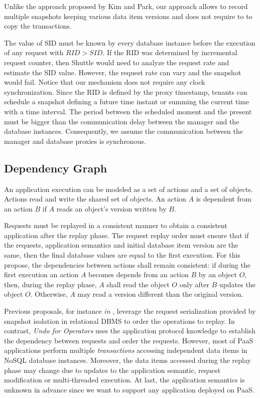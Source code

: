 Unlike the approach proposed by Kim and Park, our approach allows to record multiple snapshots keeping various data item versions and does not require to to copy the transactions.

The value of \acf{SID} must be known by every database instance before the execution of any request with $RID > SID$. If the \ac{RID} was determined by incremental request counter, then Shuttle would need to analyze the request rate and estimate the \ac{SID} value. However, the request rate can vary and the snapshot would fail. Notice that our mechanism does not require any clock synchronization. Since the \ac{RID} is defined by the proxy timestamp, tenants can schedule a snapshot defining a future time instant or summing the current time with a time interval. The period between the scheduled moment and the present must be bigger than the communication delay between the manager and the database instances. Consequently, we assume the communication between the manager and database proxies is synchronous. 


\subsection{Dependency Graph}
\label{sec:arch:dependencies}
An application execution can be modeled as a set of actions and a set of objects. Actions read and write the shared set of objects. An action $A$ is dependent from an action $B$ if $A$ reads an object's version written by $B$.

Requests must be replayed in a consistent manner to obtain a consistent application after the replay phase. The request replay order must ensure that if the requests, application semantics and initial database item version are the same, then the final database values are equal to the first execution. For this propose, the dependencies between actions shall remain consistent: if during the first execution an action $A$ becomes depends from an action $B$ by an object $O$, then, during the replay phase, $A$ shall read the object $O$ only after $B$ updates the object $O$. Otherwise, $A$ may read a version different than the original version.

Previous proposals, for instance \emph{in} \cite{goel}, leverage the request serialization provided by snapshot isolation in relational \ac{DBMS} to order the operations to replay. In contrast, \textit{Undo for Operators} \cite{undoForOperators} uses the application protocol knowledge to establish the dependency between requests and order the requests. However, most of \ac{PaaS} applications perform multiple \textit{transactions} accessing independent data items in \acs{NoSQL} database instances. Moreover, the data items accessed during the replay phase may change due to updates to the application semantic, request modification or multi-threaded execution. At last, the application semantics is unknown in advance since we want to support any application deployed on \ac{PaaS}.\\


